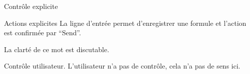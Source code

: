 \begin{frame}{Contrôle explicite}

  \begin{block}{Actions explicites}
    La ligne d'entrée permet d'enregistrer une formule et l'action
    est confirmée par ``Send''.

    La clarté de ce mot est discutable.
  \end{block}

  \begin{block}{Contrôle utilisateur.}
    L'utilisateur n'a pas de contrôle, cela n'a pas de sens ici.
  \end{block}

\end{frame}
